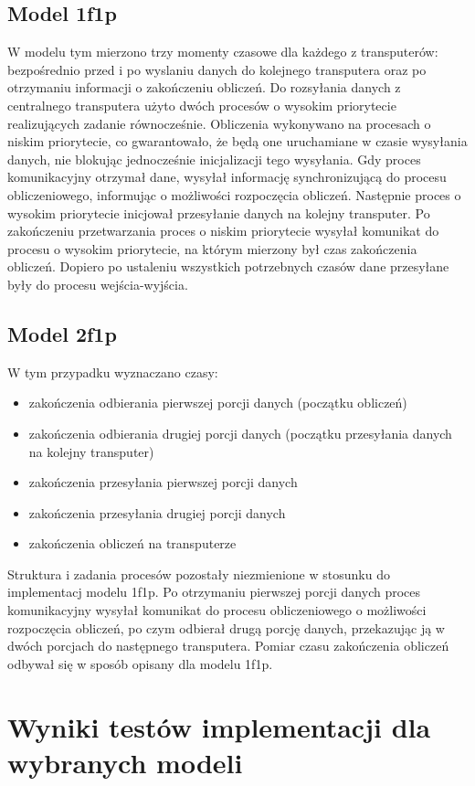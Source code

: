 \documentclass[a4paper,11pt, titlepage]{article}
\begin{document}
\subsection{Model 1f1p}
W modelu tym mierzono trzy momenty czasowe dla każdego z transputerów: bezpośrednio przed i po wyslaniu danych do kolejnego transputera oraz po otrzymaniu informacji o zakończeniu obliczeń. Do rozsyłania danych z centralnego transputera użyto dwóch procesów o wysokim priorytecie realizujących zadanie równocześnie. Obliczenia wykonywano na procesach o niskim priorytecie, co gwarantowało, że będą one uruchamiane w czasie wysyłania danych, nie blokując jednocześnie inicjalizacji tego wysyłania. Gdy proces komunikacyjny otrzymał dane, wysyłał informację synchronizującą do procesu obliczeniowego, informując o możliwości rozpoczęcia obliczeń. Następnie proces o wysokim priorytecie inicjował przesyłanie danych na kolejny transputer. Po zakończeniu przetwarzania proces o niskim priorytecie wysyłał komunikat do procesu o wysokim priorytecie, na którym mierzony był czas zakończenia obliczeń. Dopiero po ustaleniu wszystkich potrzebnych czasów dane przesyłane były do procesu wejścia-wyjścia.
\subsection{Model 2f1p}
W tym  przypadku wyznaczano czasy:
\begin{itemize}
\item zakończenia odbierania pierwszej porcji danych (początku obliczeń)
\item zakończenia odbierania drugiej porcji danych (początku przesyłania danych na kolejny transputer)
\item zakończenia przesyłania pierwszej porcji danych
\item zakończenia przesyłania drugiej porcji danych
\item zakończenia obliczeń na transputerze
\end{itemize}
Struktura i zadania procesów pozostały niezmienione w stosunku do implementacj modelu 1f1p. Po otrzymaniu pierwszej porcji danych proces komunikacyjny wysyłał komunikat do procesu obliczeniowego o możliwości rozpoczęcia obliczeń, po czym odbierał drugą porcję danych, przekazując ją w dwóch porcjach do następnego transputera. Pomiar czasu zakończenia obliczeń odbywał się w sposób opisany dla modelu 1f1p.
\section{Wyniki testów implementacji dla wybranych modeli}
\end{document}
